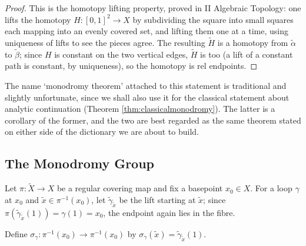 \begin{proof}
	This is the homotopy lifting property, proved in II Algebraic Topology: one lifts the
	homotopy $H : [0,1]^2 \to X$ by subdividing the square into small squares each mapping
	into an evenly covered set, and lifting them one at a time, using uniqueness of lifts to
	see the pieces agree. The resulting $\tilde H$ is a homotopy from $\tilde\alpha$ to
	$\tilde\beta$; since $H$ is constant on the two vertical edges, $\tilde H$ is too (a
	lift of a constant path is constant, by uniqueness), so the homotopy is rel endpoints.
\end{proof}

The name `monodromy theorem' attached to this statement is traditional and slightly
unfortunate, since we shall also use it for the classical statement about analytic
continuation (Theorem \ref{thm:classicalmonodromy}). The latter is a corollary of the
former, and the two are best regarded as the same theorem stated on either side of the
dictionary we are about to build.

\subsection{The Monodromy Group}

Let $\pi : \tilde X \to X$ be a regular covering map and fix a basepoint $x_0 \in X$. For
a loop $\gamma$ at $x_0$ and $\tilde x \in \pi^{-1}(x_0)$, let $\tilde\gamma_{\tilde x}$
be the lift starting at $\tilde x$; since $\pi(\tilde\gamma_{\tilde x}(1)) = \gamma(1) = x_0$,
the endpoint again lies in the fibre.

\begin{definition}
	Define $\sigma_\gamma : \pi^{-1}(x_0) \to \pi^{-1}(x_0)$ by
	$\sigma_\gamma(\tilde x) = \tilde\gamma_{\tilde x}(1)$.
\end{definition}


